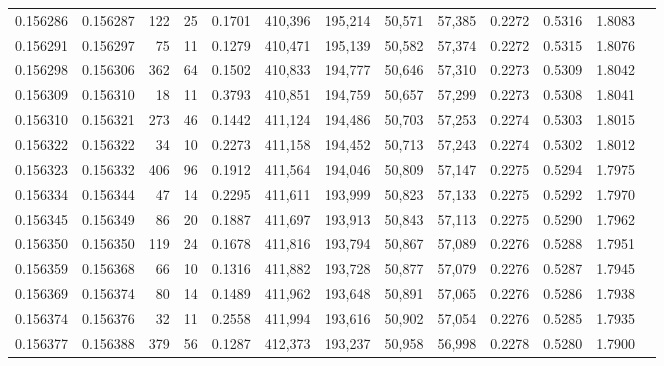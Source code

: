 \begin{tabular}{rrrrrrrrrrrrr}
0.156286 & 0.156287 &   122 &  25 &                                     0.1701 & 410,396 & 195,214 &  50,571 &  57,385 & 0.2272 & 0.5316 & 1.8083 \\
0.156291 & 0.156297 &    75 &  11 &                                     0.1279 & 410,471 & 195,139 &  50,582 &  57,374 & 0.2272 & 0.5315 & 1.8076 \\
0.156298 & 0.156306 &   362 &  64 &                                     0.1502 & 410,833 & 194,777 &  50,646 &  57,310 & 0.2273 & 0.5309 & 1.8042 \\
0.156309 & 0.156310 &    18 &  11 &                                     0.3793 & 410,851 & 194,759 &  50,657 &  57,299 & 0.2273 & 0.5308 & 1.8041 \\
0.156310 & 0.156321 &   273 &  46 &                                     0.1442 & 411,124 & 194,486 &  50,703 &  57,253 & 0.2274 & 0.5303 & 1.8015 \\
0.156322 & 0.156322 &    34 &  10 &                                     0.2273 & 411,158 & 194,452 &  50,713 &  57,243 & 0.2274 & 0.5302 & 1.8012 \\
0.156323 & 0.156332 &   406 &  96 &                                     0.1912 & 411,564 & 194,046 &  50,809 &  57,147 & 0.2275 & 0.5294 & 1.7975 \\
0.156334 & 0.156344 &    47 &  14 &                                     0.2295 & 411,611 & 193,999 &  50,823 &  57,133 & 0.2275 & 0.5292 & 1.7970 \\
0.156345 & 0.156349 &    86 &  20 &                                     0.1887 & 411,697 & 193,913 &  50,843 &  57,113 & 0.2275 & 0.5290 & 1.7962 \\
0.156350 & 0.156350 &   119 &  24 &                                     0.1678 & 411,816 & 193,794 &  50,867 &  57,089 & 0.2276 & 0.5288 & 1.7951 \\
0.156359 & 0.156368 &    66 &  10 &                                     0.1316 & 411,882 & 193,728 &  50,877 &  57,079 & 0.2276 & 0.5287 & 1.7945 \\
0.156369 & 0.156374 &    80 &  14 &                                     0.1489 & 411,962 & 193,648 &  50,891 &  57,065 & 0.2276 & 0.5286 & 1.7938 \\
0.156374 & 0.156376 &    32 &  11 &                                     0.2558 & 411,994 & 193,616 &  50,902 &  57,054 & 0.2276 & 0.5285 & 1.7935 \\
0.156377 & 0.156388 &   379 &  56 &                                     0.1287 & 412,373 & 193,237 &  50,958 &  56,998 & 0.2278 & 0.5280 & 1.7900 \\

\end{tabular}
